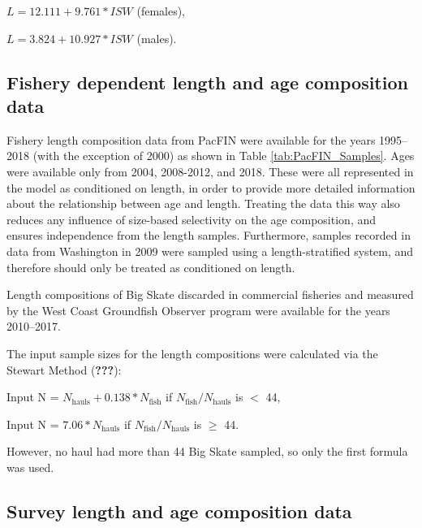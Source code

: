 \documentclass[12pt,]{article}
\begin{document}
\begin{centering}

$L = 12.111 + 9.761*ISW$ (females),

$L = 3.824 + 10.927*ISW$ (males).

\end{centering}

\hypertarget{fishery-dependent-length-and-age-composition-data}{%
\subsection{Fishery dependent length and age composition
data}\label{fishery-dependent-length-and-age-composition-data}}

Fishery length composition data from PacFIN were available for the years
1995--2018 (with the exception of 2000) as shown in Table
\ref{tab:PacFIN_Samples}. Ages were available only from 2004, 2008-2012,
and 2018. These were all represented in the model as conditioned on
length, in order to provide more detailed information about the
relationship between age and length. Treating the data this way also
reduces any influence of size-based selectivity on the age composition,
and ensures independence from the length samples. Furthermore, samples
recorded in data from Washington in 2009 were sampled using a
length-stratified system, and therefore should only be treated as
conditioned on length.

Length compositions of Big Skate discarded in commercial fisheries and
measured by the West Coast Groundfish Observer program were available
for the years 2010--2017.

The input sample sizes for the length compositions were calculated via
the Stewart Method ({\textbf{???}}):

\begin{centering}

Input N = $N_{\text{hauls}} + 0.138 * N_{\text{fish}}$ if $N_{\text{fish}}/N_{\text{hauls}}$ is $<$ 44,

Input N = $7.06 * N_{\text{hauls}}$ if $N_{\text{fish}}/N_{\text{hauls}}$ is $\geq$ 44.

\end{centering}

However, no haul had more than 44 Big Skate sampled, so only the first
formula was used.

\hypertarget{survey-length-and-age-composition-data}{%
\subsection{Survey length and age composition
data}\label{survey-length-and-age-composition-data}}
\end{document}
